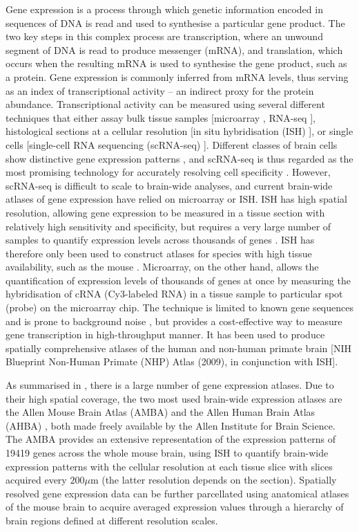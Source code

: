 Gene expression is a process through which genetic information encoded in sequences of DNA is read and used to synthesise a particular gene product.
The two key steps in this complex process are transcription, where an unwound segment of DNA is read to produce messenger (mRNA), and translation, which occurs when the resulting mRNA is used to synthesise the gene product, such as a protein. Gene expression is commonly inferred from mRNA levels, thus serving as an index of transcriptional activity -- an indirect proxy for the protein abundance.
Transcriptional activity can be measured using several different techniques that either assay bulk tissue samples [microarray \citep{Schulze2001}, RNA-seq \citep{Mortazavi2008,Wang2009}], histological sections at a cellular resolution [in situ hybridisation (ISH) \citep{Unger2010}], or single cells [single-cell RNA sequencing (scRNA-seq) \citep{Tang2009}].
Different classes of brain cells show distinctive gene expression patterns \citep{Darmanis2015,Tasic2016,Poulin2016,Mancarci2017}, and scRNA-seq is thus regarded as the most promising technology for accurately resolving cell specificity \citep{Yu2016}.
However, scRNA-seq is difficult to scale to brain-wide analyses, and current brain-wide atlases of gene expression have relied on microarray or ISH.
ISH has high spatial resolution, allowing gene expression to be measured in a tissue section with relatively high sensitivity and specificity, but requires a very large number of samples to quantify expression levels across thousands of genes \citep{Unger2010}.
ISH has therefore only been used to construct atlases for species with high tissue availability, such as the mouse \citep{Lein2007a}.
Microarray, on the other hand, allows the quantification of expression levels of thousands of genes at once by measuring the hybridisation of cRNA (Cy3-labeled RNA) in a tissue sample to particular spot (probe) on the microarray chip.
The technique is limited to known gene sequences and is prone to background noise \citep{Okoniewski2006,Royce2007}, but provides a cost-effective way to measure gene transcription in high-throughput manner. It has been used to produce spatially comprehensive atlases of the human \citep{Kang2011,Hawrylycz2012,Miller2014} and non-human primate brain [NIH Blueprint Non-Human Primate (NHP) Atlas (2009), in conjunction with ISH].

As summarised in \citet{Keil2018}, there is a large number of gene expression atlases.
Due to their high spatial coverage, the two most used brain-wide expression atlases are the Allen Mouse Brain Atlas (AMBA) \citep{Lein2007a} and the Allen Human Brain Atlas (AHBA) \citep{Hawrylycz2012}, both made freely available by the Allen Institute for Brain Science.
The AMBA provides an extensive representation of the expression patterns of \num{19419} genes across the whole mouse brain, using ISH to quantify brain-wide expression patterns with the cellular resolution at each tissue slice with slices acquired every $200\mu$m (the latter resolution depends on the section).
Spatially resolved gene expression data can be further parcellated using anatomical atlases of the mouse brain \citep{Johnson2010,Furth2018} to acquire averaged expression values through a hierarchy of brain regions defined at different resolution scales.

